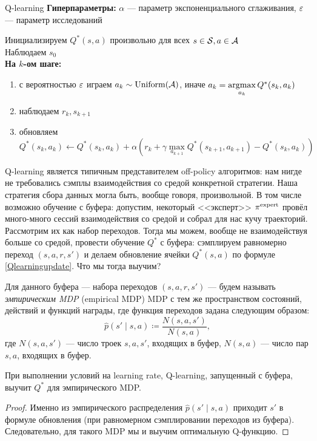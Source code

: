 \begin{algorithm}[label=alg:qlearning]{Q-learning}
\textbf{Гиперпараметры:} $\alpha$ --- параметр экспоненциального сглаживания, $\varepsilon$ --- параметр исследований

\vspace{0.3cm}
Инициализируем $Q^*(s, a)$ произвольно для всех $s \in \mathcal{S}, a \in \mathcal{A}$ \\
Наблюдаем $s_0$ \\ 
\textbf{На $k$-ом шаге:}
\begin{enumerate}
    \item с вероятностью $\varepsilon$ играем $a_k \sim \operatorname{Uniform}(\mathcal{A})$, иначе $a_k = \mathop{\mathrm{argmax}}\limits_{a_k} Q^*(s_k, a_k)$
    \item наблюдаем $r_k, s_{k+1}$
    \item обновляем $Q^*(s_k, a_k) \leftarrow Q^*(s_k, a_k) + \alpha \left( r_k + \gamma \max\limits_{a_{k+1}} Q^*(s_{k+1}, a_{k+1}) - Q^*(s_k, a_k) \right)$
\end{enumerate}
\end{algorithm}

Q-learning является типичным представителем off-policy алгоритмов: нам нигде не требовались сэмплы взаимодействия со средой конкретной стратегии. Наша стратегия сбора данных могла быть, вообще говоря, произвольной. В том числе возможно обучение с буфера: допустим, некоторый <<эксперт>> $\pi^{\mathrm{expert}}$ провёл много-много сессий взаимодействия со средой и собрал для нас кучу траекторий. Рассмотрим их как набор переходов. Тогда мы можем, вообще не взаимодействуя больше со средой, провести обучение $Q^*$ с буфера: сэмплируем равномерно переход $(s, a, r, s')$ и делаем обновление ячейки $Q^*(s, a)$ по формуле \eqref{Qlearningupdate}. Что мы тогда выучим?

\begin{definition}
Для данного буфера --- набора переходов $(s, a, r, s')$ --- будем называть \emph{эмпирическим MDP} (empirical MDP) MDP с тем же пространством состояний, действий и функций награды, где функция переходов задана следующим образом:
$$\hat{p}(s' \mid s, a) \coloneqq \frac{N(s, a, s')}{N(s, a)},$$
где $N(s, a, s')$ --- число троек $s, a, s'$, входящих в буфер, $N(s, a)$ --- число пар $s, a$, входящих в буфер.
\end{definition}

\begin{proposition}
При выполнении условий на learning rate, Q-learning, запущенный с буфера, выучит $Q^*$ для эмпирического MDP.
\begin{proof}
Именно из эмпирического распределения $\hat{p}(s' \mid s, a)$ приходит $s'$ в формуле обновления (при равномерном сэмплировании переходов из буфера). Следовательно, для такого MDP мы и выучим оптимальную Q-функцию.
\end{proof}
\end{proposition}

